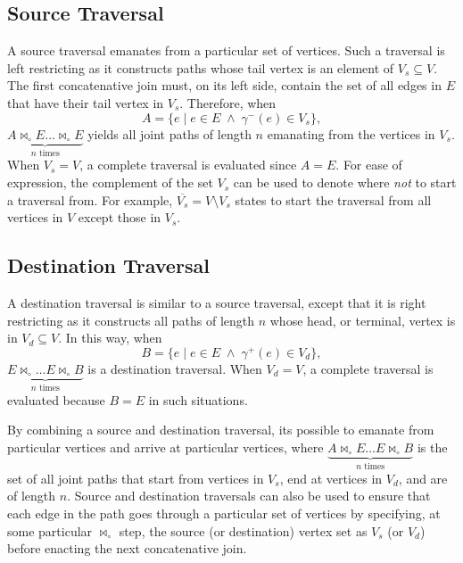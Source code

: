 \documentclass[10pt,conference,letterpaper]{IEEEtran}
\newcommand{\join}{\bowtie_\circ}
\begin{document}
\subsection{Source Traversal}

A source traversal emanates from a particular set of vertices. Such a traversal is left restricting as it constructs paths whose tail vertex is an element of $V_s \subseteq V$. The first concatenative join must, on its left side, contain the set of all edges in $E$ that have their tail vertex in $V_s$. Therefore, when 
\begin{equation*}
A = \{ e \; | \; e \in E \; \wedge \; \gamma^-(e) \in V_s \},
\end{equation*}
$\underbrace{A \join E \ldots \join E}_{n \text{ times}}$ yields all joint paths of length $n$ emanating from the vertices in $V_s$. When $V_s = V$, a complete traversal is evaluated since $A = E$. For ease of expression, the complement of the set $V_s$ can be used to denote where \textit{not} to start a traversal from. For example, $\overline{V_s} = V \setminus V_s$ states to start the traversal from all vertices in $V$ except those in $V_s$.

\subsection{Destination Traversal}

A destination traversal is similar to a source traversal, except that it is right restricting as it constructs all paths of length $n$ whose head, or terminal, vertex is in $V_d \subseteq V$. In this way, when
\begin{equation*}
B = \{ e \; | \; e \in E \; \wedge \; \gamma^+(e) \in V_d \},
\end{equation*}
$\underbrace{E \join \ldots E \join B}_{n \text{ times}}$ is a destination traversal. When $V_d = V$, a complete traversal is evaluated because $B = E$ in such situations.

By combining a source and destination traversal, its possible to emanate from particular vertices and arrive at particular vertices, where $\underbrace{A \join E \ldots E \join B}_{n \text{ times}}$ is the set of all joint paths that start from vertices in $V_s$, end at vertices in $V_d$, and are of length $n$. Source and destination traversals can also be used to ensure that each edge in the path goes through a particular set of vertices by specifying, at some particular $\join$ step, the source (or destination) vertex set as $V_s$ (or $V_d$) before enacting the next concatenative join.
\end{document}
